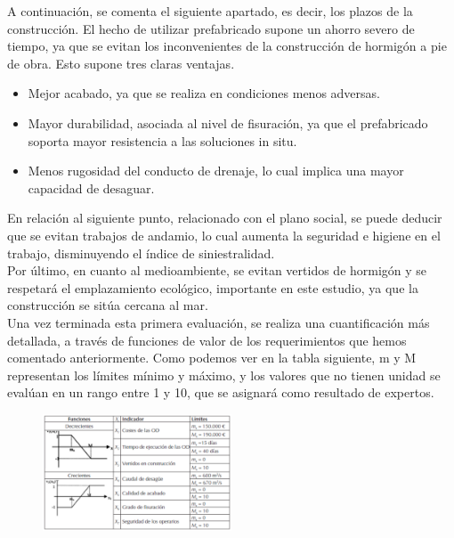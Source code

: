 \documentclass[10pt]{article}
\begin{document}
A continuación, se comenta el siguiente apartado, es decir, los plazos de la construcción. El hecho de utilizar prefabricado supone un ahorro severo de tiempo, ya que se evitan los inconvenientes de la construcción de hormigón a pie de obra. Esto supone tres claras ventajas.

\begin{itemize}

	\item Mejor acabado, ya que se realiza en condiciones menos adversas.
	
	\item Mayor durabilidad, asociada al nivel de fisuración, ya que el prefabricado soporta mayor resistencia a las soluciones in situ.

	\item Menos rugosidad del conducto de drenaje, lo cual implica una mayor capacidad de desaguar.

\end{itemize}

En relación al siguiente punto, relacionado con el plano social, se puede deducir que se evitan trabajos de andamio, lo cual aumenta la seguridad e higiene en el trabajo, disminuyendo el índice de siniestralidad. \\

Por último, en cuanto al medioambiente, se evitan vertidos de hormigón y se respetará el emplazamiento ecológico, importante en este estudio, ya que la construcción se sitúa cercana al mar.\\

Una vez terminada esta primera evaluación, se realiza una cuantificación más detallada, a través de funciones de valor de los requerimientos que hemos comentado anteriormente. Como podemos ver en la tabla siguiente, m y M representan los límites mínimo y máximo, y los valores que no tienen unidad se evalúan en un rango entre 1 y 10, que se asignará como resultado de expertos.

\begin{figure}[H]
	\begin{center}
 		\includegraphics[width = 0.5\textwidth]{Imagenes/img5.eps}
	\end{center} 
\end{figure}
\end{document}
